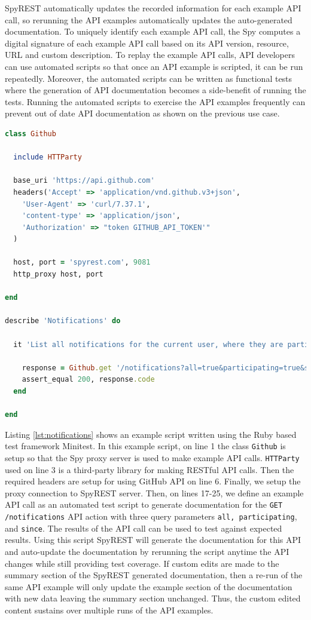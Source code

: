 SpyREST automatically updates the recorded information for each example API call, so rerunning the API examples automatically updates the auto-generated documentation. To uniquely identify each example API call, the Spy computes a digital signature of each example API call based on its API version, resource, URL and custom description. To replay the example API calls, API developers can use automated scripts so that once an API example is scripted, it can be run repeatedly. Moreover, the automated scripts can be written as functional tests where the generation of API documentation becomes a side-benefit of running the tests. Running the automated scripts to exercise the API examples frequently can prevent out of date API documentation as shown on the previous use case.

\begin{lstlisting}[language=ruby, breaklines=true, caption={}, label=list:ex, float,floatplacement=H, caption=Example API call using SpyREST, label={lst:notifications}]
class Github

  include HTTParty

  base_uri 'https://api.github.com'
  headers('Accept' => 'application/vnd.github.v3+json',
    'User-Agent' => 'curl/7.37.1',
    'content-type' => 'application/json',
    'Authorization' => "token GITHUB_API_TOKEN'"
  )

  host, port = 'spyrest.com', 9081
  http_proxy host, port

end

describe 'Notifications' do

  it 'List all notifications for the current user, where they are participating, since a time' do

    response = Github.get '/notifications?all=true&participating=true&since=2014-01-01T00:00:00Z'
    assert_equal 200, response.code
  end

end\end{lstlisting}

Listing \ref{lst:notifications} shows an example script written using the Ruby based test framework Minitest. In this example script, on line 1 the class \texttt{Github} is setup so that the Spy proxy server is used to make example API calls. \texttt{HTTParty} used on line 3 is a third-party library for making RESTful API calls. Then the required headers are setup for using GitHub API on line 6. Finally, we setup the proxy connection to SpyREST server. Then, on lines 17-25, we define an example API call as an automated test script to generate documentation for the \texttt{GET /notifications} API action with three query parameters \texttt{all, participating}, and \texttt{since}. The results of the API call can be used to test against expected results. Using this script SpyREST will generate the documentation for this API and auto-update the documentation by rerunning the script anytime the API changes while still providing test coverage. If custom edits are made to the summary section of the SpyREST generated documentation, then a re-run of the same API example will only update the example section of the documentation with new data leaving the summary section unchanged. Thus, the custom edited content sustains over multiple runs of the API examples.

